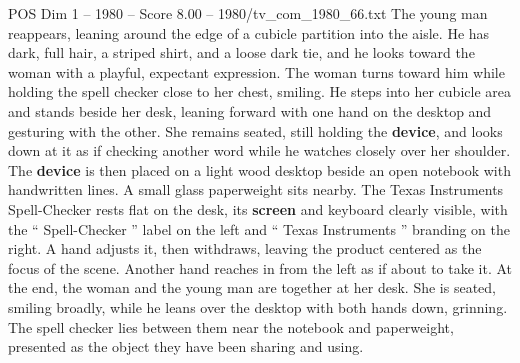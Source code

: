 \begin{textsample}{POS Dim 1 – 1980 – Score 8.00 – 1980/tv\_com\_1980\_66.txt}
The young man reappears, leaning around the edge of a cubicle partition into the aisle.
He has dark, full hair, a striped shirt, and a loose dark tie, and he looks toward the woman with a playful, expectant expression.
The woman turns toward him while holding the spell checker close to her chest, smiling.
He steps into her cubicle area and stands beside her desk, leaning forward with one hand on the desktop and gesturing with the other.
She remains seated, still holding the \textbf{device}, and looks down at it as if checking another word while he watches closely over her shoulder.
The \textbf{device} is then placed on a light wood desktop beside an open notebook with handwritten lines.
A small glass paperweight sits nearby.
The Texas Instruments Spell-Checker rests flat on the desk, its \textbf{screen} and keyboard clearly visible, with the “ Spell-Checker ” label on the left and “ Texas Instruments ” branding on the right.
A hand adjusts it, then withdraws, leaving the product centered as the focus of the scene.
Another hand reaches in from the left as if about to take it.
At the end, the woman and the young man are together at her desk.
She is seated, smiling broadly, while he leans over the desktop with both hands down, grinning.
The spell checker lies between them near the notebook and paperweight, presented as the object they have been sharing and using.

\end{textsample}
